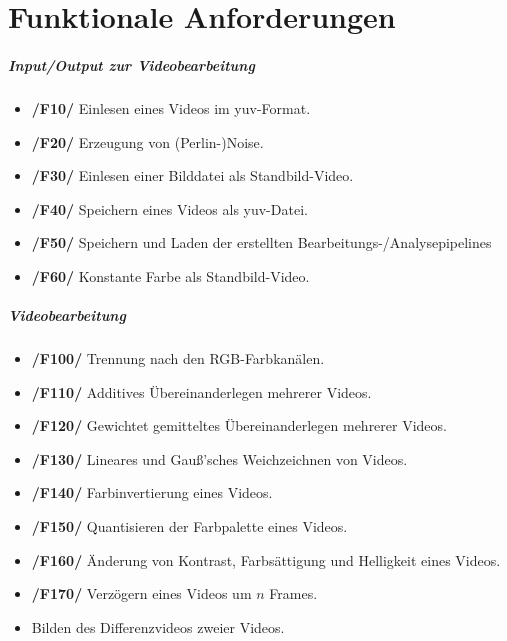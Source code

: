 \section{Funktionale Anforderungen}

\subparagraph{Input/Output zur Videobearbeitung} 
\begin{itemize} 
	\item \textbf{/F10/} Einlesen eines Videos im yuv-Format.
	\item \textbf{/F20/} Erzeugung von (Perlin-)Noise.
	\item \textbf{/F30/} Einlesen einer Bilddatei als Standbild-Video.
	\item \textbf{/F40/} Speichern eines Videos als yuv-Datei.
	\item \textbf{/F50/} Speichern und Laden der erstellten Bearbeitungs-/Analysepipelines
	\item \textbf{/F60/} Konstante Farbe als Standbild-Video.
\end{itemize}

\subparagraph{Videobearbeitung}
\begin{itemize}
	\item \textbf{/F100/} Trennung nach den RGB-Farbkanälen.
	\item \textbf{/F110/} Additives Übereinanderlegen mehrerer Videos.
	\item \textbf{/F120/} Gewichtet gemitteltes Übereinanderlegen mehrerer Videos.
	\item \textbf{/F130/} Lineares und Gauß'sches Weichzeichnen von Videos.
	\item \textbf{/F140/} Farbinvertierung eines Videos.
	\item \textbf{/F150/} Quantisieren der Farbpalette eines Videos.
	\item \textbf{/F160/} Änderung von Kontrast, Farbsättigung und Helligkeit eines Videos.
	\item \textbf{/F170/} Verzögern eines Videos um $n$ Frames.	
	\item {} Bilden des Differenzvideos zweier Videos.
\end{itemize}

